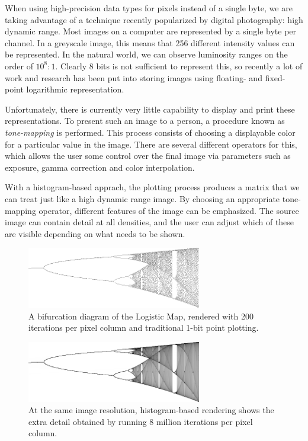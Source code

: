 \documentclass[letterpaper, 11pt]{article}
\begin{document}
When using high-precision data types for pixels instead of a single byte, we are taking
advantage of a technique recently popularized by digital photography: high dynamic range.
Most images on a computer are represented by a single byte per channel.  In a greyscale
image, this means that 256 different intensity values can be represented.  In the natural
world, we can observe luminosity ranges on the order of $10^8:1$.  Clearly 8 bits is not
sufficient to represent this, so recently a lot of work and research has been put into
storing images using floating- and fixed-point logarithmic representation.

Unfortunately, there is currently very little capability to display and print these
representations.  To present such an image to a person, a procedure known as
\emph{tone-mapping} is performed.  This process consists of choosing a displayable color for
a particular value in the image.  There are several different operators for this, which
allows the user some control over the final image via parameters such as exposure, gamma
correction and color interpolation.

With a histogram-based apprach, the plotting process produces a matrix that we can treat
just like a high dynamic range image.  By choosing an appropriate tone-mapping operator,
different features of the image can be emphasized.  The source image can contain detail
at all densities, and the user can adjust which of these are visible depending on what
needs to be shown.

\begin{subfigures}
\label{logistic}

\begin{figure}[htb]
\centering
\includegraphics[width=3in]{figures/logistic-traditional-200.png}
\caption{A bifurcation diagram of the Logistic Map, rendered with 200 iterations per pixel column and traditional 1-bit point plotting.}
\end{figure}

\begin{figure}[htb]
\centering
\includegraphics[width=3in]{figures/logistic-histogram-8m.png}
\caption{At the same image resolution, histogram-based rendering shows the extra detail obtained by running 8 million iterations per pixel column.}
\end{figure}

\end{subfigures}
\end{document}
